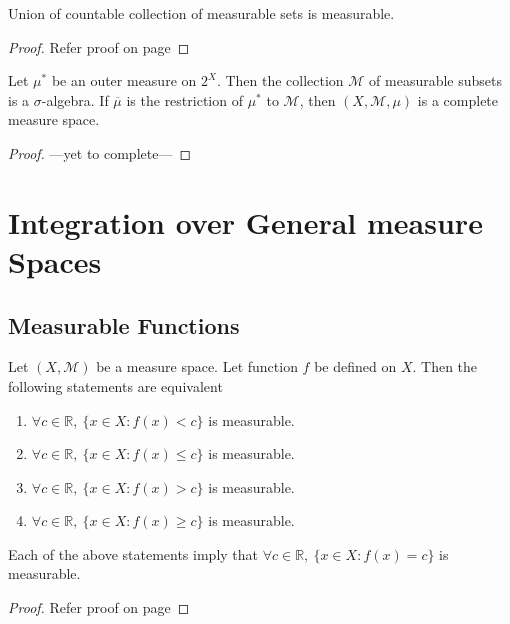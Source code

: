 \begin{theorem}
	Union of countable collection of measurable sets is measurable.
\end{theorem}
\begin{proof}
	Refer proof on page \pageref{thm:countableunionmeasurable}
\end{proof}

\begin{theorem}
	Let $\mu^\ast$ be an outer measure on $2^X$.
	Then the collection $\mathcal{M}$ of measurable subsets is a $\sigma$-algebra.
	If $\overline{\mu}$ is the restriction of $\mu^\ast$ to $\mathcal{M}$, then $(X,\mathcal{M},\mu)$ is a complete measure space.
\end{theorem}
\begin{proof}
	---yet to complete---
\end{proof}


\section{Integration over General measure Spaces}
\subsection{Measurable Functions}

\begin{theorem}
	Let $(X,\mathcal{M})$ be a measure space.
	Let function $f$ be defined on $X$.
	Then the following statements are equivalent
	\begin{enumerate}
		\item $\forall c \in \mathbb{R},\ \{ x \in X : f(x) < c \}$ is measurable.
		\item $\forall c \in \mathbb{R},\ \{ x \in X : f(x) \le c \}$ is measurable.
		\item $\forall c \in \mathbb{R},\ \{ x \in X : f(x) > c \}$ is measurable.
		\item $\forall c \in \mathbb{R},\ \{ x \in X : f(x) \ge c \}$ is measurable.
	\end{enumerate}
	Each of the above statements imply that $\forall c \in \mathbb{R},\ \{ x \in X : f(x) = c \}$ is measurable.
\end{theorem}
\begin{proof}
	Refer proof on page \pageref{thm:4measurablesets}
\end{proof}

